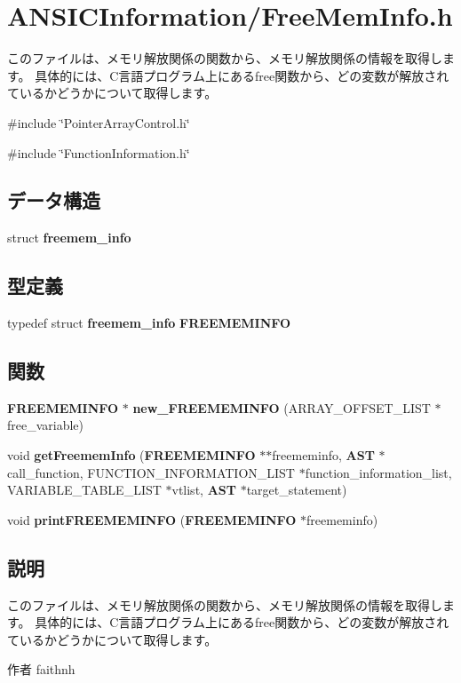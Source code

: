 \section{ANSICInformation/FreeMemInfo.h}
\label{_free_mem_info_8h}


このファイルは、メモリ解放関係の関数から、メモリ解放関係の情報を取得します。 具体的には、C言語プログラム上にあるfree関数から、どの変数が解放されているかどうかについて取得します。  


{\ttfamily \#include \char`\"{}PointerArrayControl.h\char`\"{}}\par
{\ttfamily \#include \char`\"{}FunctionInformation.h\char`\"{}}\par
\subsection*{データ構造}
\begin{DoxyCompactItemize}
\item 
struct {\bf freemem\_\-info}
\end{DoxyCompactItemize}
\subsection*{型定義}
\begin{DoxyCompactItemize}
\item 
typedef struct {\bf freemem\_\-info} {\bf FREEMEMINFO}
\end{DoxyCompactItemize}
\subsection*{関数}
\begin{DoxyCompactItemize}
\item 
{\bf FREEMEMINFO} $\ast$ {\bf new\_\-FREEMEMINFO} (ARRAY\_\-OFFSET\_\-LIST $\ast$free\_\-variable)
\item 
void {\bf getFreememInfo} ({\bf FREEMEMINFO} $\ast$$\ast$freememinfo, {\bf AST} $\ast$call\_\-function, FUNCTION\_\-INFORMATION\_\-LIST $\ast$function\_\-information\_\-list, VARIABLE\_\-TABLE\_\-LIST $\ast$vtlist, {\bf AST} $\ast$target\_\-statement)
\item 
void {\bf printFREEMEMINFO} ({\bf FREEMEMINFO} $\ast$freememinfo)
\end{DoxyCompactItemize}


\subsection{説明}
このファイルは、メモリ解放関係の関数から、メモリ解放関係の情報を取得します。 具体的には、C言語プログラム上にあるfree関数から、どの変数が解放されているかどうかについて取得します。 \begin{DoxyAuthor}{作者}
faithnh 
\end{DoxyAuthor}


